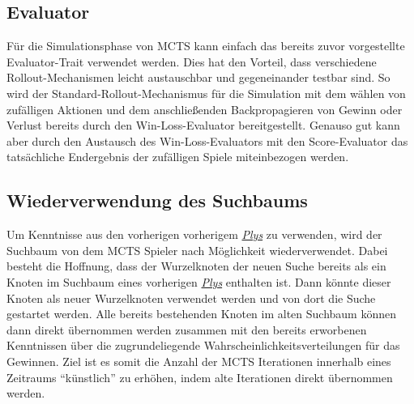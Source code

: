 \subsection{Evaluator}

Für die Simulationsphase von \ac{MCTS} kann einfach das bereits zuvor vorgestellte Evaluator-Trait verwendet werden. Dies hat den Vorteil, dass verschiedene Rollout-Mechanismen leicht austauschbar und gegeneinander testbar sind. So wird der Standard-Rollout-Mechanismus für die Simulation mit dem wählen von zufälligen Aktionen und dem anschließenden Backpropagieren von Gewinn oder Verlust bereits durch den Win-Loss-Evaluator bereitgestellt. Genauso gut kann aber durch den Austausch des Win-Loss-Evaluators mit den Score-Evaluator das tatsächliche Endergebnis der zufälligen Spiele miteinbezogen werden.

\subsection{Wiederverwendung des Suchbaums}

Um Kenntnisse aus den vorherigen vorherigem \hyperref[text:ply]{\emph{Plys}} zu verwenden, wird der Suchbaum von dem \ac{MCTS} Spieler nach Möglichkeit wiederverwendet. Dabei besteht die Hoffnung, dass der Wurzelknoten der neuen Suche bereits als ein Knoten im Suchbaum eines vorherigen \hyperref[text:ply]{\emph{Plys}} enthalten ist. Dann könnte dieser Knoten als neuer Wurzelknoten verwendet werden und von dort die Suche gestartet werden. Alle bereits bestehenden Knoten im alten Suchbaum können dann direkt übernommen werden zusammen mit den bereits erworbenen Kenntnissen über die zugrundeliegende Wahrscheinlichkeitsverteilungen für das Gewinnen. Ziel ist es somit die Anzahl der \ac{MCTS} Iterationen innerhalb eines Zeitraums \enquote{künstlich} zu erhöhen, indem alte Iterationen direkt übernommen werden.

